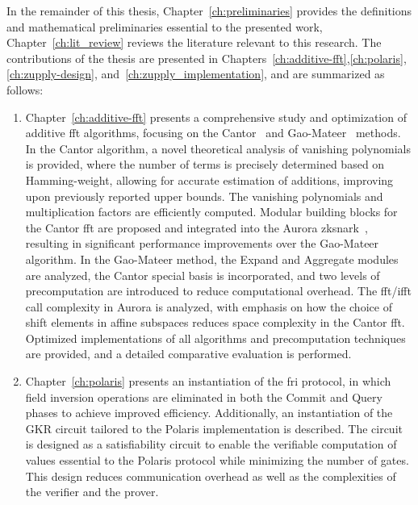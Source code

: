 In the remainder of this thesis, Chapter~\ref{ch:preliminaries} provides the definitions and mathematical preliminaries essential to the presented work, Chapter~\ref{ch:lit_review} reviews the literature relevant to this research. The contributions of the thesis are presented in Chapters~\ref{ch:additive-fft},\ref{ch:polaris},\ref{ch:zupply-design}, and~\ref{ch:zupply_implementation}, and are summarized as follows:
\begin{enumerate}
\item Chapter~\ref{ch:additive-fft} presents a comprehensive study and optimization of additive \gls{fft} algorithms, focusing on the Cantor~\cite{Cantor1989FFT} and Gao-Mateer~\cite{Gao2010FFT} methods. In the Cantor algorithm, a novel theoretical analysis of vanishing polynomials is provided, where the number of terms is precisely determined based on Hamming-weight, allowing for accurate estimation of additions, improving upon previously reported upper bounds. The vanishing polynomials and multiplication factors are efficiently computed. Modular building blocks for the Cantor \gls{fft} are proposed and integrated into the Aurora \gls{zksnark}~\cite{libiop}, resulting in significant performance improvements over the Gao-Mateer algorithm. In the Gao-Mateer method, the \textsf{Expand} and \textsf{Aggregate} modules are analyzed, the Cantor special basis is incorporated, and two levels of precomputation are introduced to reduce computational overhead. The \gls{fft}/\gls{ifft} call complexity in Aurora is analyzed, with emphasis on how the choice of shift elements in affine subspaces reduces space complexity in the Cantor \gls{fft}. Optimized \CC implementations of all algorithms and precomputation techniques are provided, and a detailed comparative evaluation is performed.

\item Chapter~\ref{ch:polaris} presents an instantiation of the \gls{fri} protocol, in which field inversion operations are eliminated in both the Commit and Query phases to achieve improved efficiency. Additionally, an instantiation of the GKR circuit tailored to the Polaris implementation is described. The circuit is designed as a satisfiability circuit to enable the verifiable computation of values essential to the Polaris protocol while minimizing the number of gates. This design reduces communication overhead as well as the complexities of the verifier and the prover.


\end{enumerate}

